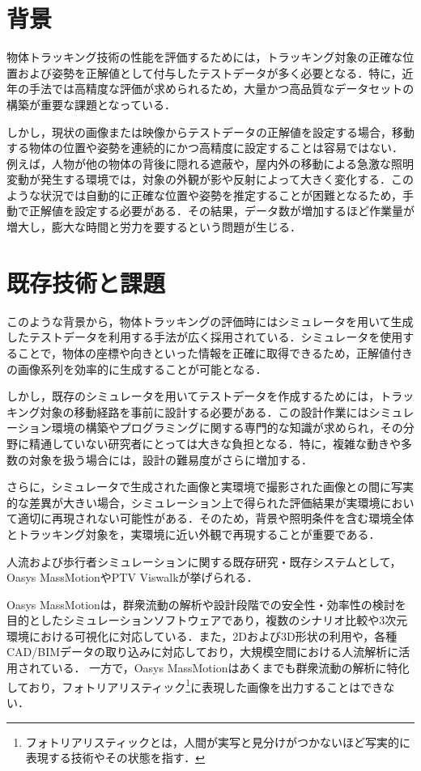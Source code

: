\documentclass[twocolumn, a4j]{jarticle}
\begin{document}
\twocolumn[\makeHeader]

\section{背景}
物体トラッキング技術の性能を評価するためには，トラッキング対象の正確な位置および姿勢を正解値として付与したテストデータが多く必要となる．特に，近年の手法では高精度な評価が求められるため，大量かつ高品質なデータセットの構築が重要な課題となっている．

しかし，現状の画像または映像からテストデータの正解値を設定する場合，移動する物体の位置や姿勢を連続的にかつ高精度に設定することは容易ではない．
例えば，人物が他の物体の背後に隠れる遮蔽や，屋内外の移動による急激な照明変動が発生する環境では，対象の外観が影や反射によって大きく変化する．このような状況では自動的に正確な位置や姿勢を推定することが困難となるため，手動で正解値を設定する必要がある．その結果，データ数が増加するほど作業量が増大し，膨大な時間と労力を要するという問題が生じる．

\section{既存技術と課題}
このような背景から，物体トラッキングの評価時にはシミュレータを用いて生成したテストデータを利用する手法が広く採用されている．シミュレータを使用することで，物体の座標や向きといった情報を正確に取得できるため，正解値付きの画像系列を効率的に生成することが可能となる．

しかし，既存のシミュレータを用いてテストデータを作成するためには，トラッキング対象の移動経路を事前に設計する必要がある．この設計作業にはシミュレーション環境の構築やプログラミングに関する専門的な知識が求められ，その分野に精通していない研究者にとっては大きな負担となる．特に，複雑な動きや多数の対象を扱う場合には，設計の難易度がさらに増加する．

さらに，シミュレータで生成された画像と実環境で撮影された画像との間に写実的な差異が大きい場合，シミュレーション上で得られた評価結果が実環境において適切に再現されない可能性がある．そのため，背景や照明条件を含む環境全体とトラッキング対象を，実環境に近い外観で再現することが重要である．

人流および歩行者シミュレーションに関する既存研究・既存システムとして，Oasys MassMotionやPTV Viswalkが挙げられる．

Oasys MassMotionは，群衆流動の解析や設計段階での安全性・効率性の検討を目的としたシミュレーションソフトウェアであり，複数のシナリオ比較や3次元環境における可視化に対応している．また，2Dおよび3D形状の利用や，各種CAD/BIMデータの取り込みに対応しており，大規模空間における人流解析に活用されている．
一方で，Oasys MassMotionはあくまでも群衆流動の解析に特化しており，フォトリアリスティック\footnote{フォトリアリスティックとは，人間が実写と見分けがつかないほど写実的に表現する技術やその状態を指す．}に表現した画像を出力することはできない．
\end{document}
